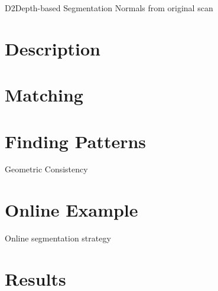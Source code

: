 D2Depth-based Segmentation
Normals from original scan

\section{Description}
\label{sec:description}

\section{Matching}
\label{sec:matching}

\section{Finding Patterns}
\label{sec:filtering}

Geometric Consistency

\section{Online Example}
\label{sec:online}

Online segmentation strategy

\section{Results}
\label{sec:segmatch-results}
